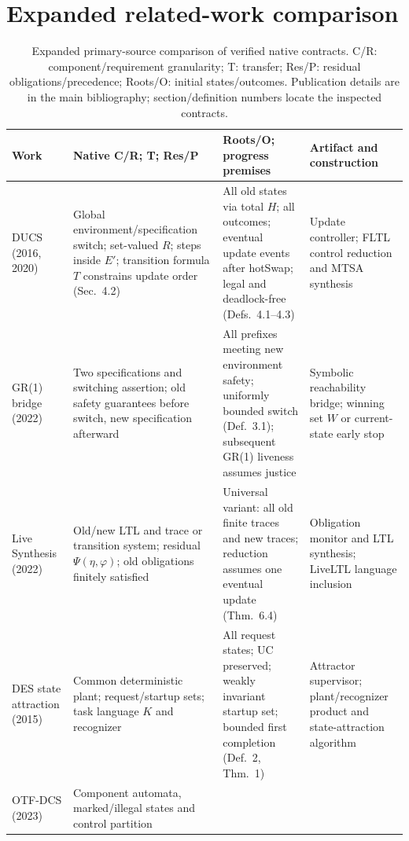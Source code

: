 \documentclass[11pt]{article}
\begin{document}
\section{Expanded related-work comparison}
\begin{table}[!htbp]
\caption{Expanded primary-source comparison of verified native contracts. C/R: component/requirement granularity; T: transfer; Res/P: residual obligations/precedence; Roots/O: initial states/outcomes. Publication details are in the main bibliography; section/definition numbers locate the inspected contracts.}
\label{tab:supp-native}
\centering\footnotesize
\setlength{\tabcolsep}{3pt}\renewcommand{\arraystretch}{1.02}
\begin{tabular}{@{}>{\raggedright\arraybackslash}p{.15\linewidth}>{\raggedright\arraybackslash}p{.28\linewidth}>{\raggedright\arraybackslash}p{.29\linewidth}>{\raggedright\arraybackslash}p{.23\linewidth}@{}}
\toprule
Work & Native C/R; T; Res/P & Roots/O; progress premises & Artifact and construction\\
\midrule
DUCS (2016, 2020)
& Global environment/specification switch; set-valued $R$; steps inside $E'$; transition formula $T$ constrains update order (Sec.~4.2)
& All old states via total $H$; all outcomes; eventual update events after hotSwap; legal and deadlock-free (Defs.~4.1--4.3)
& Update controller; FLTL control reduction and MTSA synthesis\\
GR(1) bridge (2022)
& Two specifications and switching assertion; old safety guarantees before switch, new specification afterward
& All prefixes meeting new environment safety; uniformly bounded switch (Def.~3.1); subsequent GR(1) liveness assumes justice
& Symbolic reachability bridge; winning set $W$ or current-state early stop\\
Live Synthesis (2022)
& Old/new LTL and trace or transition system; residual $\Psi(\eta,\varphi)$; old obligations finitely satisfied
& Universal variant: all old finite traces and new traces; reduction assumes one eventual update (Thm.~6.4)
& Obligation monitor and LTL synthesis; LiveLTL language inclusion\\
DES state attraction (2015)
& Common deterministic plant; request/startup sets; task language $K$ and recognizer
& All request states; UC preserved; weakly invariant startup set; bounded first completion (Def.~2, Thm.~1)
& Attractor supervisor; plant/recognizer product and state-attraction algorithm\\
OTF-DCS (2023)
& Component automata, marked/illegal states and control partition

\end{tabular}
\end{table}
\end{document}

